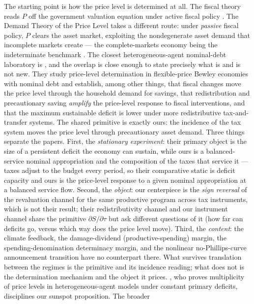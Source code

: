 \documentclass[12pt]{article}
\newcommand{\Sfun}{S}
\begin{document}
The starting point is how the price level is determined at all. The fiscal
theory reads $P$ off the government valuation equation under active fiscal
policy \citep{leeper1991,sims1994,woodford1995,cochrane2023}. The Demand
Theory of the Price Level \citep{hagedorn2026dtpl} takes a different route:
under \emph{passive} fiscal policy, $P$ clears the asset market, exploiting
the nondegenerate asset demand that incomplete markets create --- the
complete-markets economy being the indeterminate benchmark
\citep{sargentwallace1975}. The closest heterogeneous-agent nominal-debt laboratory is
\citet{kaplannikolakoudisviolante2023}, and the overlap is close enough to
state precisely what is and is not new. They study price-level determination
in flexible-price Bewley economies with nominal debt and establish, among
other things, that fiscal changes move the price level through the household
demand for savings, that redistribution and precautionary saving
\emph{amplify} the price-level response to fiscal interventions, and that
the maximum sustainable deficit is lower under more redistributive
tax-and-transfer systems. The shared primitive is exactly ours: the
incidence of the tax system moves the price level through precautionary
asset demand. Three things separate the papers. First, the \emph{stationary
experiment}: their primary object is the size of a persistent deficit the
economy can sustain, while ours is a balanced-service nominal appropriation
and the composition of the taxes that service it --- taxes adjust to the
budget every period, so their comparative static is deficit capacity and ours
is the price-level response to a given nominal appropriation at a balanced
service flow. Second,
the \emph{object}: our centerpiece is the \emph{sign reversal} of the
revaluation channel for the same productive program across tax instruments,
which is not their result; their redistributivity channel and our
instrument channel share the primitive $\partial\Sfun/\partial\tau$ but ask
different questions of it (how far can deficits go, versus which way does
the price level move). Third, the \emph{content}: the climate feedback, the
damage-dividend (productive-spending) margin, the spending-denomination
determinacy margin, and the nonlinear no-Phillips-curve announcement
transition have no counterpart there. What survives translation between the
regimes is the primitive and its incidence reading; what does not is the
determination mechanism and the object it prices. \citet{hoefer2025}, who
proves multiplicity of price levels in heterogeneous-agent models under
constant primary deficits, disciplines our sunspot proposition. The broader
\end{document}
